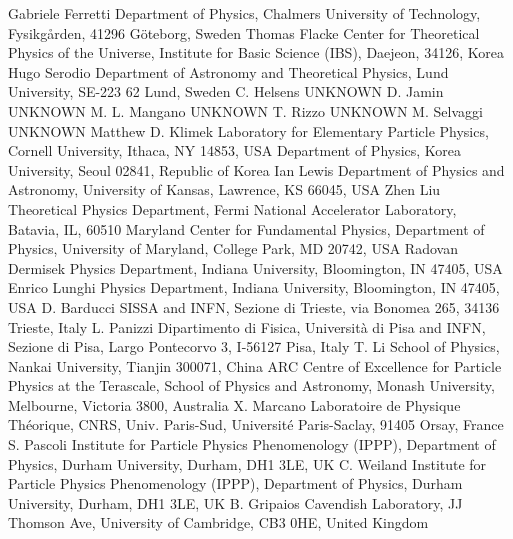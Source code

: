 Gabriele Ferretti {Department of Physics, Chalmers University of Technology, Fysikg\aa rden, 41296 G\"oteborg, Sweden}
Thomas Flacke {Center for Theoretical Physics of the Universe, Institute for Basic Science (IBS), Daejeon, 34126, Korea}
Hugo Serodio {Department of Astronomy and Theoretical Physics, Lund University, SE-223 62 Lund, Sweden}
C. Helsens {UNKNOWN}
D. Jamin {UNKNOWN}
M. L. Mangano {UNKNOWN}
T. Rizzo {UNKNOWN}
M. Selvaggi {UNKNOWN}
Matthew D. Klimek {Laboratory for Elementary Particle Physics, Cornell University, Ithaca, NY 14853, USA} {Department of Physics, Korea University, Seoul 02841, Republic of Korea}
Ian Lewis {Department of Physics and Astronomy, University of Kansas, Lawrence, KS 66045, USA}
Zhen Liu {Theoretical Physics Department, Fermi National Accelerator Laboratory, Batavia, IL, 60510} {Maryland Center for Fundamental Physics, Department of Physics, University of Maryland, College Park, MD 20742, USA}
Radovan Dermisek {Physics Department, Indiana University, Bloomington, IN 47405, USA}
Enrico Lunghi {Physics Department, Indiana University, Bloomington, IN 47405, USA}
D. Barducci {SISSA and INFN, Sezione di Trieste, via Bonomea 265, 34136 Trieste, Italy}
L. Panizzi {Dipartimento di Fisica, Universit\`a di Pisa and INFN, Sezione di Pisa, Largo Pontecorvo 3, I-56127 Pisa, Italy}
T. Li {School of Physics, Nankai University, Tianjin 300071, China} {ARC Centre of Excellence for Particle Physics at the Terascale, School of Physics and Astronomy, Monash University, Melbourne, Victoria 3800, Australia}
X. Marcano {Laboratoire de Physique Th\'eorique, CNRS, Univ. Paris-Sud, Universit\'e Paris-Saclay, 91405 Orsay, France}
S. Pascoli {Institute for Particle Physics Phenomenology (IPPP), Department of Physics, Durham University, Durham, DH1 3LE, UK}
C. Weiland {Institute for Particle Physics Phenomenology (IPPP), Department of Physics, Durham University, Durham, DH1 3LE, UK}
B. Gripaios {Cavendish Laboratory, JJ Thomson Ave, University of Cambridge, CB3 0HE, United Kingdom}
